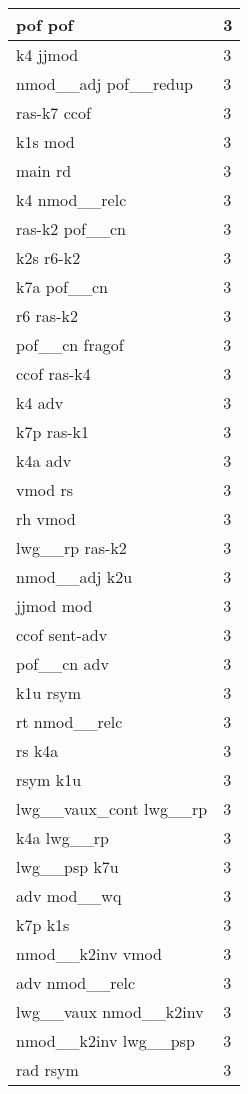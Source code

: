 \documentclass[a4 paper]{article}
\begin{document}
\begin{longtable}{p{}p{}}
pof pof  & 3 \\ \midrule
k4 jjmod  & 3 \\ \midrule
nmod\_\_adj pof\_\_redup  & 3 \\ \midrule
ras-k7 ccof  & 3 \\ \midrule
k1s mod  & 3 \\ \midrule
main rd  & 3 \\ \midrule
k4 nmod\_\_relc  & 3 \\ \midrule
ras-k2 pof\_\_cn  & 3 \\ \midrule
k2s r6-k2  & 3 \\ \midrule
k7a pof\_\_cn  & 3 \\ \midrule
r6 ras-k2  & 3 \\ \midrule
pof\_\_cn fragof  & 3 \\ \midrule
ccof ras-k4  & 3 \\ \midrule
k4 adv  & 3 \\ \midrule
k7p ras-k1  & 3 \\ \midrule
k4a adv  & 3 \\ \midrule
vmod rs  & 3 \\ \midrule
rh vmod  & 3 \\ \midrule
lwg\_\_rp ras-k2  & 3 \\ \midrule
nmod\_\_adj k2u  & 3 \\ \midrule
jjmod mod  & 3 \\ \midrule
ccof sent-adv  & 3 \\ \midrule
pof\_\_cn adv  & 3 \\ \midrule
k1u rsym  & 3 \\ \midrule
rt nmod\_\_relc  & 3 \\ \midrule
rs k4a  & 3 \\ \midrule
rsym k1u  & 3 \\ \midrule
lwg\_\_vaux\_cont lwg\_\_rp  & 3 \\ \midrule
k4a lwg\_\_rp  & 3 \\ \midrule
lwg\_\_psp k7u  & 3 \\ \midrule
adv mod\_\_wq  & 3 \\ \midrule
k7p k1s  & 3 \\ \midrule
nmod\_\_k2inv vmod  & 3 \\ \midrule
adv nmod\_\_relc  & 3 \\ \midrule
lwg\_\_vaux nmod\_\_k2inv  & 3 \\ \midrule
nmod\_\_k2inv lwg\_\_psp  & 3 \\ \midrule
rad rsym  & 3 \\ \midrule

\end{longtable}
\end{document}
